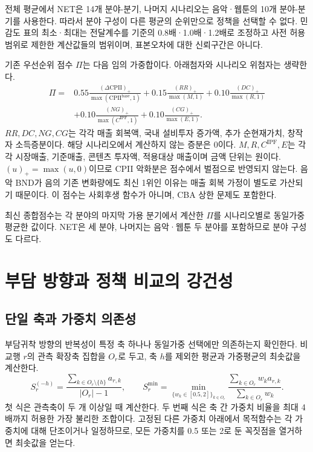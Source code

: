 \documentclass[11pt,a4paper]{report}
\begin{document}
전체 평균에서 NET은 14개 분야-분기, 나머지 시나리오는 음악·웹툰의 10개 분야-분기를 사용한다. 따라서 분야 구성이 다른 평균의 순위만으로 정책을 선택할 수 없다. 민감도 표의 최소·최대는 전달계수를 기준의 0.8배·1.0배·1.2배로 조정하고 사전 허용범위로 제한한 계산값들의 범위이며, 표본오차에 대한 신뢰구간은 아니다.

기존 우선순위 점수 \(\Pi\)는 다음 임의 가중합이다. 아래첨자와 시나리오 위첨자는 생략한다.
\[
\begin{aligned}
\Pi={}&0.55\frac{(\Delta\mathrm{CPII})_+}{\max(\mathrm{CPII}^{\mathrm{base}},1)}
+0.15\frac{(RR)_+}{\max(M,1)}
+0.10\frac{(DC)_+}{\max(R,1)}\\
&+0.10\frac{(NG)_+}{\max(C^{\mathrm{IPF}},1)}
+0.10\frac{(CG)_+}{\max(E,1)} .
\end{aligned}
\]
\(RR,DC,NG,CG\)는 각각 매출 회복액, 국내 설비투자 증가액, 추가 순현재가치, 창작자 소득증분이다. 해당 시나리오에서 계산하지 않는 증분은 0이다. \(M,R,C^{\mathrm{IPF}},E\)는 각각 시장매출, 기준매출, 콘텐츠 투자액, 적용대상 매출이며 금액 단위는 원이다. \((u)_+=\max(u,0)\)이므로 CPII 악화분은 점수에서 벌점으로 반영되지 않는다. 음악 BND가 음의 기존 변화량에도 최신 1위인 이유는 매출 회복 가정이 별도로 가산되기 때문이다. 이 점수는 사회후생 함수가 아니며, CBA 상한 문제도 포함한다.

최신 종합점수는 각 분야의 마지막 가용 분기에서 계산한 \(\Pi\)를 시나리오별로 동일가중 평균한 값이다. NET은 세 분야, 나머지는 음악·웹툰 두 분야를 포함하므로 분야 구성도 다르다.

\section{부담 방향과 정책 비교의 강건성}
\subsection{단일 축과 가중치 의존성}
부담귀착 방향의 반복성이 특정 축 하나나 동일가중 선택에만 의존하는지 확인한다. 비교행 \(r\)의 관측 확장축 집합을 \(O_r\)로 두고, 축 \(h\)를 제외한 평균과 가중평균의 최솟값을 계산한다.
\[
S^{(-h)}_r=\frac{\sum_{k\in O_r\setminus\{h\}}a_{r,k}}{|O_r|-1},
\qquad
S^{\min}_r=
\min_{\{w_k\in[0.5,2]\}_{k\in O_r}}
\frac{\sum_{k\in O_r}w_k a_{r,k}}{\sum_{k\in O_r}w_k}.
\]
첫 식은 관측축이 두 개 이상일 때 계산한다. 두 번째 식은 축 간 가중치 비율을 최대 4배까지 허용한 가장 불리한 조합이다. 고정된 다른 가중치 아래에서 목적함수는 각 가중치에 대해 단조이거나 일정하므로, 모든 가중치를 0.5 또는 2로 둔 꼭짓점을 열거하면 최솟값을 얻는다.
\end{document}
